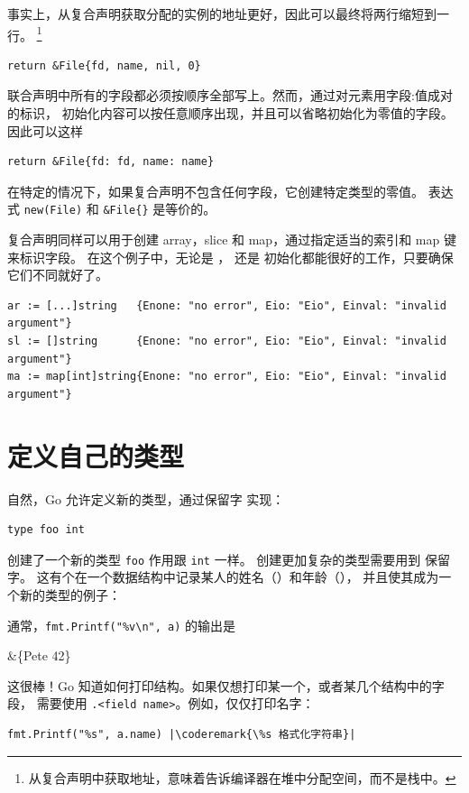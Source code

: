 事实上，从复合声明获取分配的实例的地址更好，因此可以最终将两行缩短到一行。
\footnote{从复合声明中获取地址，意味着告诉编译器在堆中分配空间，而不是栈中。}
\begin{lstlisting}
return &File{fd, name, nil, 0}
\end{lstlisting}
联合声明中所有的字段都必须按顺序全部写上。然而，通过对元素用字段:值成对的标识，
初始化内容可以按任意顺序出现，并且可以省略初始化为零值的字段。因此可以这样

\begin{lstlisting}
return &File{fd: fd, name: name}
\end{lstlisting}
在特定的情况下，如果复合声明不包含任何字段，它创建特定类型的零值。
表达式 \lstinline{new(File)} 和 \lstinline|&File{}| 是等价的。

复合声明同样可以用于创建 array，slice 和 map，通过指定适当的索引和 map 键来标识字段。
在这个例子中，无论是 ， 还是  初始化都能很好的工作，只要确保它们不同就好了。
\begin{lstlisting}
ar := [...]string   {Enone: "no error", Eio: "Eio", Einval: "invalid argument"}
sl := []string      {Enone: "no error", Eio: "Eio", Einval: "invalid argument"}
ma := map[int]string{Enone: "no error", Eio: "Eio", Einval: "invalid argument"}
\end{lstlisting}

\section{定义自己的类型}
\label{sec:defining your own}
自然，Go 允许定义新的类型，通过保留字
 实现： 
\begin{lstlisting}
type foo int
\end{lstlisting}
创建了一个新的类型 \lstinline{foo} 作用跟 \lstinline{int} 一样。
创建更加复杂的类型需要用到  保留字。
这有个在一个数据结构中记录某人的姓名（）和年龄（），
并且使其成为一个新的类型的例子：

通常，\lstinline{fmt.Printf("%v\n", a)} 的输出是
\begin{display}
&\{Pete 42\}
\end{display}
这很棒！Go 知道如何打印结构。如果仅想打印某一个，或者某几个结构中的字段，
需要使用 \verb|.<field name>|。例如，仅仅打印名字：
\begin{lstlisting}
fmt.Printf("%s", a.name) |\coderemark{\%s 格式化字符串}|
\end{lstlisting}

